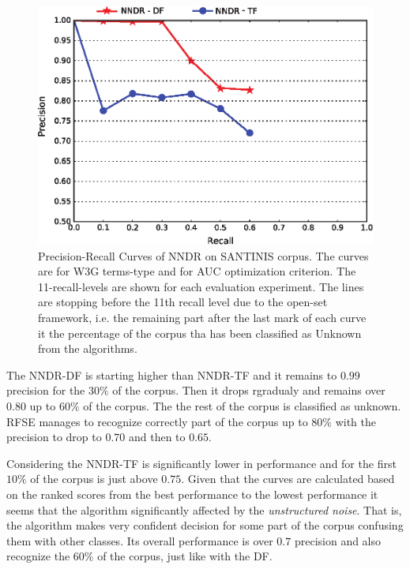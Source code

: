 \begin{figure}[H]
\begin{center}
    \includegraphics[scale=0.99]{Figures/NNDR_W3G.eps}
	\caption{Precision-Recall Curves of NNDR on SANTINIS corpus. The curves are for W3G terms-type and for AUC optimization criterion. The 11-recall-levels are shown for each evaluation experiment. The lines are stopping before the 11th recall level due to the open-set framework, i.e. the remaining part after the last mark of each curve it the percentage of the corpus tha has been classified as Unknown from the algorithms.}
	\label{chap:word_embeddings:fig:NNDR_W3G}
	\end{center}
\end{figure}

The NNDR-DF is starting higher than NNDR-TF and it remains to $0.99$ precision for the $30\%$ of the corpus. Then it drops rgradualy and remains over $0.80$ up to $60\%$ of the corpus. The the rest of the corpus is classified as unknown. RFSE manages to recognize correctly part of the corpus up to $80\%$ with the precision to drop to $0.70$ and then to $0.65$. 

Considering the NNDR-TF is significantly lower in performance and for the first $10\%$ of the corpus is just above $0.75$. Given that the curves are calculated based on the ranked scores from the best performance to the lowest performance it seems that the algorithm significantly affected by the \textit{unstructured noise}. That is, the algorithm makes very confident decision for some part of the corpus confusing them with other classes. Its overall performance is over $0.7$ precision and also recognize the $60\%$ of the corpus, just like with the DF.

